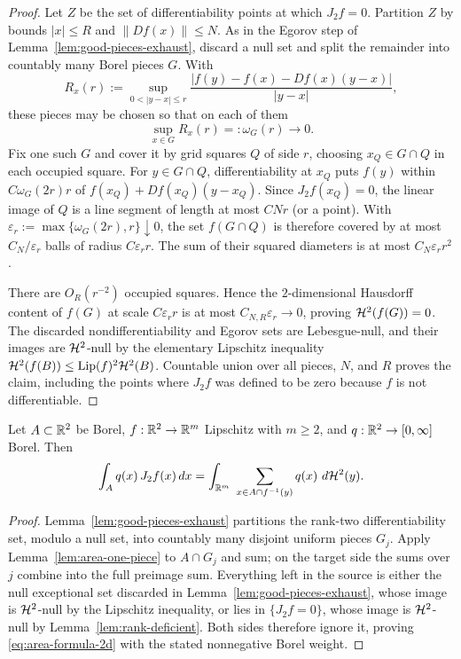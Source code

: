 \begin{proof}
Let $Z$ be the set of differentiability points at which $J_2f=0$.  Partition
$Z$ by bounds $|x|\le R$ and $\|Df(x)\|\le N$.  As in the Egorov step of
Lemma~\ref{lem:good-pieces-exhaust}, discard a null set and split the
remainder into countably many Borel pieces $G$.  With
\[
 R_x(r):=\sup_{0<|y-x|\le r}
 \frac{|f(y)-f(x)-Df(x)(y-x)|}{|y-x|},
\]
these pieces may be chosen so that on each of them
\[
 \sup_{x\in G}R_x(r)=:\omega_G(r)\longrightarrow0.
\]
Fix one such $G$ and cover it by grid squares $Q$ of side $r$, choosing
$x_Q\in G\cap Q$ in each occupied square.  For $y\in G\cap Q$, differentiability
at $x_Q$ puts $f(y)$ within $C\omega_G(2r)r$ of
$f(x_Q)+Df(x_Q)(y-x_Q)$.  Since $J_2f(x_Q)=0$, the linear image of $Q$ is a
line segment of length at most $CNr$ (or a point).  With
$\varepsilon_r:=\max\{\omega_G(2r),r\}\downarrow0$, the set $f(G\cap Q)$
is therefore covered by at most $C_N/\varepsilon_r$ balls of radius
$C\varepsilon_rr$.  The sum of their squared diameters is at most
$C_N\varepsilon_rr^2$.

There are $O_R(r^{-2})$ occupied squares.  Hence the $2$-dimensional
Hausdorff content of $f(G)$ at scale $C\varepsilon_rr$ is at most
$C_{N,R}\varepsilon_r\to0$, proving $\mathcal H^2(f(G))=0$.  The discarded
nondifferentiability and Egorov sets are Lebesgue-null, and their images are
$\mathcal H^2$-null by the elementary Lipschitz inequality
$\mathcal H^2(f(B))\le\operatorname{Lip}(f)^2\mathcal H^2(B)$.  Countable union over all pieces, $N$, and
$R$ proves the claim, including the points where $J_2f$ was defined to be
zero because $f$ is not differentiable.
\end{proof}

\begin{theorem}
\label{thm:area-formula-2d}
Let $A\subset\mathbb R^2$ be Borel, $f:\mathbb R^2\to\mathbb R^m$ Lipschitz with $m\ge2$, and
$q:\mathbb R^2\to[0,\infty]$ Borel.  Then
\begin{equation}\label{eq:area-formula-2d}
  \int_Aq(x)\,J_2f(x)\,dx
  =\int_{\mathbb R^m}\ \sum_{x\in A\cap f^{-1}(y)}q(x)\ d\mathcal H^2(y).
\end{equation}
\end{theorem}

\begin{proof}
Lemma~\ref{lem:good-pieces-exhaust} partitions the rank-two differentiability
set, modulo a null set, into countably many disjoint uniform pieces $G_j$.
Apply Lemma~\ref{lem:area-one-piece} to $A\cap G_j$ and sum; on the target
side the sums over $j$ combine into the full preimage sum.  Everything left
in the source is either the null exceptional set discarded in
Lemma~\ref{lem:good-pieces-exhaust}, whose image is $\mathcal H^2$-null by the
Lipschitz inequality, or lies in $\{J_2f=0\}$, whose image is $\mathcal H^2$-null by
Lemma~\ref{lem:rank-deficient}.  Both sides therefore ignore it, proving
\eqref{eq:area-formula-2d} with the stated nonnegative Borel weight.
\end{proof}

